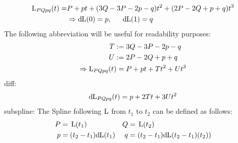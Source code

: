 	$$\begin{aligned}
		\operatorname{L}_{PQpq}(t) =& P + pt + (3Q-3P-2p-q)t^2 + (2P-2Q+p+q)t^3 \\
		&\Rightarrow {\rm d}\hspace{-2pt}\operatorname{L}(0) = p,\phantom{--} {\rm d}\hspace{-2pt}\operatorname{L}(1) = q \\
	\end{aligned}$$
	The following abbreviation will be useful for readability purposes:
	$$\begin{aligned}
		T :=&\phantom{.} 3Q-3P-2p-q \\
		U :=&\phantom{.} 2P-2Q+p+q \\
		\Rightarrow \operatorname{L}_{PQpq}(t) =&\phantom{.} P + pt + Tt^2 + Ut^3 \\
	\end{aligned}$$
	diff:
	$$\begin{aligned}
		{\rm d}\hspace{-2pt}\operatorname{L}_{PQpq}(t) = p + 2Tt + 3Ut^2 \\
	\end{aligned}$$
	subspline:
	The Spline following $\operatorname{L}$ from $t_1$ to $t_2$ can be defined as follows:
	$$\begin{aligned}
		P =&\phantom{.} \operatorname{L}(t_1) & Q =&\phantom{.} \operatorname{L}(t_2) \\
		p =&\phantom{.} (t_2-t_1){\rm d}\hspace{-2pt}\operatorname{L}(t_1) & q =&\phantom{.} (t_2-t_1){\rm d}\hspace{-2pt}\operatorname{L}(t_2-t_1)(t_2)) \\
	\end{aligned}$$
